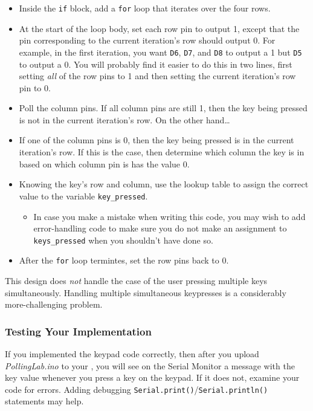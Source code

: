    \begin{itemize}
    \item Inside the \lstinline{if} block, add a \lstinline{for} loop that
        iterates over the four rows.
    \item At the start of the loop body, set each row pin to output 1, except
        that the pin corresponding to the current iteration's row should output
        0. For example, in the first iteration, you want \texttt{D6},
        \texttt{D7}, and \texttt{D8} to output a 1 but \texttt{D5} to output a
        0. You will probably find it easier to do this in two lines, first
        setting \textit{all} of the row pins to 1 and then setting the current
        iteration's row pin to 0.
    \item Poll the column pins. If all column pins are still 1, then the key
        being pressed is not in the current iteration's row. On the other
        hand\dots
    \item If one of the column pins is 0, then the key being pressed is in the
        current iteration's row. If this is the case, then determine which
        column the key is in based on which column pin is has the value 0.
    \item Knowing the key's row and column, use the lookup table to assign the correct value to the variable \lstinline{key_pressed}.
        \begin{itemize}
        \item In case you make a mistake when writing this code, you may wish
            to add error-handling code to make sure you do not make an
            assignment to \lstinline{keys_pressed} when you shouldn't have done
            so.
        \end{itemize}
    \item After the \lstinline{for} loop termintes, set the row pins back to 0.
    \end{itemize}

This design does \textit{not} handle the case of the user pressing multiple
keys simultaneously. Handling multiple simultaneous keypresses is a
considerably more-challenging problem.

\subsubsection{Testing Your Implementation}

If you implemented the keypad code correctly, then after you upload
\textit{PollingLab.ino} to your \nano, you will see on the Serial Monitor a
message with the key value whenever you press a key on the keypad. If it does
not, examine your code for errors. Adding debugging
\lstinline{Serial.print()}/\lstinline{Serial.println()} statements may help.

